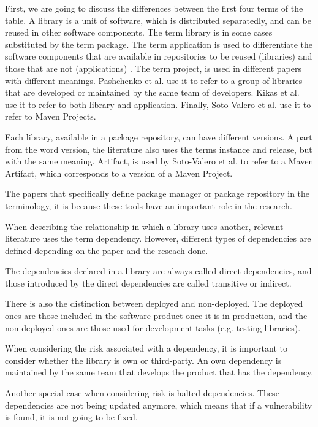 \blankls
First, we are going to discuss the differences between the first four terms of the table. A library is a unit of software, which is distributed separatedly, and can be reused in other software components. The term library is in some cases substituted by the term package. The term application is used to differentiate the software components that are available in repositories to be reused (libraries) and those that are not (applications) \cite{kikas2017structure}.
The term project, is used in different papers with different meanings. Pashchenko et al. \cite{pashchenko2018vulnerable} use it to refer to a group of libraries that are developed or maintained by the same team of developers. Kikas et al. \cite{kikas2017structure} use it to refer to both library and application. Finally, Soto-Valero et al. use it to refer to Maven Projects.

Each library, available in a package repository, can have different versions. A part from the word version, the literature also uses the terms instance and release, but with the same meaning. Artifact, is used by Soto-Valero et al. to refer to a Maven Artifact, which corresponds to a version of a Maven Project.

The papers that specifically define package manager or package repository in the terminology, it is because these tools have an important role in the research.

When describing the relationship in which a library uses another, relevant literature uses the term dependency. However, different types of dependencies are defined depending on the paper and the reseach done.

The dependencies declared in a library are always called direct dependencies, and those introduced by the direct dependencies are called transitive or indirect.

There is also the distinction between deployed and non-deployed. The deployed ones are those included in the software product once it is in production, and the non-deployed ones are those used for development tasks (e.g. testing libraries).

When considering the risk associated with a dependency, it is important to consider whether the library is own or third-party. An own dependency is maintained by the same team that develops the product that has the dependency.

Another special case when considering risk is halted dependencies. These dependencies are not being updated anymore, which means that if a vulnerability is found, it is not going to be fixed.

